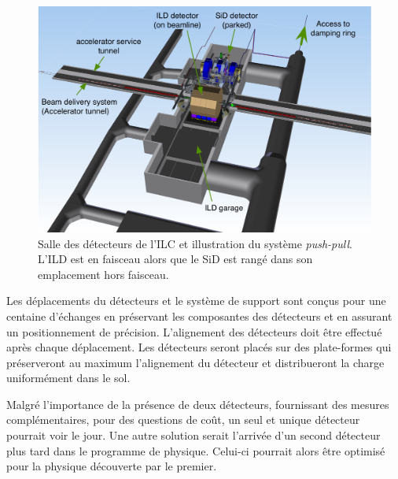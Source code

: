   
  
  \begin{figure}[!htb]
    \begin{center} 
      \includegraphics[scale=0.8]{./figures/ILC_detector_hall.jpg}
      \caption{Salle des d\'etecteurs de l'ILC et illustration du syst\`eme \textit{push-pull}. L'ILD est en faisceau alors que le SiD est rang\'e dans son emplacement hors faisceau.}
      \label{fig:ILC_hall}
    \end{center}
  \end{figure}
  
  Les d\'eplacements du d\'etecteurs et le syst\`eme de support sont con\c{c}us pour une centaine d'échanges en pr\'eservant les composantes des d\'etecteurs et en assurant un positionnement de pr\'ecision. L'alignement des d\'etecteurs doit \^etre effectu\'e apr\`es chaque d\'eplacement. Les d\'etecteurs seront plac\'es sur des plate-formes qui pr\'eserveront au maximum l'alignement du d\'etecteur et distribueront la charge uniform\'ement dans le sol.
  
  \medskip
  
  Malgr\'e l'importance de la pr\'esence de deux d\'etecteurs, fournissant des mesures compl\'ementaires, pour des questions de co\^ut, un seul et unique d\'etecteur pourrait voir le jour. Une autre solution serait l'arriv\'ee d'un second d\'etecteur plus tard dans le programme de physique. Celui-ci pourrait alors \^etre optimis\'e pour la physique d\'ecouverte par le premier.
  

